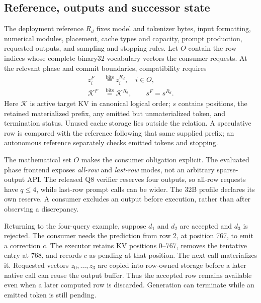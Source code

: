 \subsection{Reference, outputs and successor state}
The deployment reference $R_d$ fixes model and tokenizer bytes, input formatting, numerical modules, placement, cache types and capacity, prompt production, requested outputs, and sampling and stopping rules. Let $O$ contain the row indices whose complete binary32 vocabulary vectors the consumer requests. At the relevant phase and commit boundaries, compatibility requires
\begin{equation}
 \begin{split}
 z_i^{F}&\overset{\mathrm{bits}}{=}z_i^{R_d},\quad i\in O,\\
 \mathcal{K}^{F}&\overset{\mathrm{bits}}{=}\mathcal{K}^{R_d},\qquad
 s^{F}=s^{R_d}.
 \end{split}
 \label{eq:reference-contract}
\end{equation}
Here $\mathcal{K}$ is active target KV in canonical logical order; $s$ contains positions, the retained materialized prefix, any emitted but unmaterialized token, and termination status. Unused cache storage lies outside the relation. A speculative row is compared with the reference following that same supplied prefix; an autonomous reference separately checks emitted tokens and stopping.

The mathematical set $O$ makes the consumer obligation explicit. The evaluated phase frontend exposes \emph{all-row} and \emph{last-row} modes, not an arbitrary sparse-output API. The released Q8 verifier reserves four outputs, so all-row requests have $q\le4$, while last-row prompt calls can be wider. The 32B profile declares its own reserve. A consumer excludes an output before execution, rather than after observing a discrepancy.

Returning to the four-query example, suppose $d_1$ and $d_2$ are accepted and $d_3$ is rejected. The consumer needs the prediction from row 2, at position 767, to emit a correction $c$. The executor retains KV positions 0--767, removes the tentative entry at 768, and records $c$ as pending at that position. The next call materializes it. Requested vectors $z_0,\ldots,z_3$ are copied into row-owned storage before a later native call can reuse the output buffer. Thus the accepted row remains available even when a later computed row is discarded. Generation can terminate while an emitted token is still pending.

